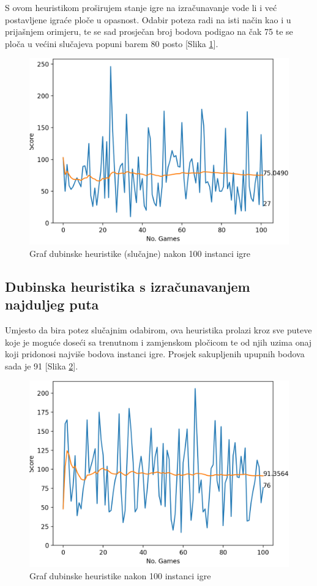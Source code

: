 \documentclass[zavrsnirad]{fer}
\begin{document}
S ovom heuristikom proširujem stanje igre na izračunavanje vode li i već postavljene igraće ploče u opasnost. Odabir poteza radi na isti način kao i u prijašnjem orimjeru, te se sad prosječan broj bodova podigao na čak 75 te se ploča u većini slučajeva popuni barem 80 posto [Slika \ref{slk:reach_graph}].

\begin{figure}[htb]
	\centering
	\includegraphics[width=0.68\linewidth]{Figures/reach.png} 
	\caption{Graf dubinske heuristike (slučajne) nakon 100 instanci igre}
	\label{slk:reach_graph}
\end{figure}


\subsection{Dubinska heuristika s izračunavanjem najduljeg puta}
\label{pog:dubinska}

Umjesto da bira potez slučajnim odabirom, ova heuristika prolazi kroz sve puteve koje je moguće doseći sa trenutnom i zamjenskom pločicom te od njih uzima onaj koji pridonosi najviše bodova instanci igre. Prosjek sakupljenih upupnih bodova sada je 91 [Slika \ref{slk:depth_graph}].

\begin{figure}[htb]
	\centering
	\includegraphics[width=0.68\linewidth]{Figures/depth.png} 
	\caption{Graf dubinske heuristike nakon 100 instanci igre}
	\label{slk:depth_graph}
\end{figure}
\end{document}
